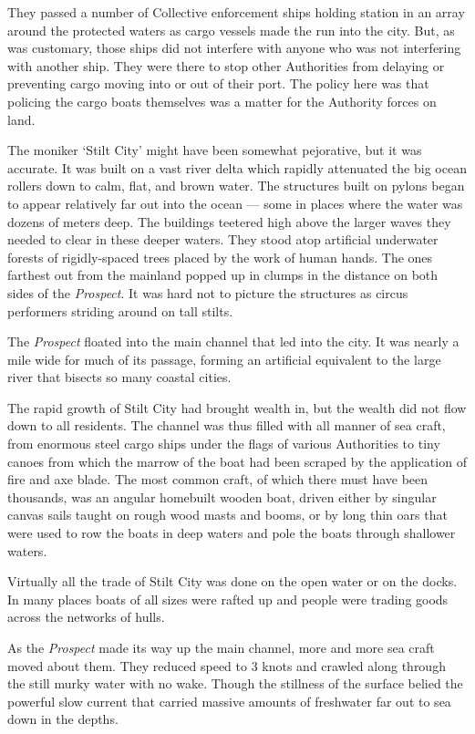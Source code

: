 \documentclass[]{scrbook}
\begin{document}
They passed a number of Collective enforcement ships holding station in
an array around the protected waters as cargo vessels made the run into
the city. But, as was customary, those ships did not interfere with
anyone who was not interfering with another ship. They were there to
stop other Authorities from delaying or preventing cargo moving into or
out of their port. The policy here was that policing the cargo boats
themselves was a matter for the Authority forces on land.

The moniker `Stilt City' might have been somewhat pejorative, but it was
accurate. It was built on a vast river delta which rapidly attenuated
the big ocean rollers down to calm, flat, and brown water. The
structures built on pylons began to appear relatively far out into the
ocean --- some in places where the water was dozens of meters deep. The
buildings teetered high above the larger waves they needed to clear in
these deeper waters. They stood atop artificial underwater forests of
rigidly-spaced trees placed by the work of human hands. The ones
farthest out from the mainland popped up in clumps in the distance on
both sides of the \emph{Prospect}. It was hard not to picture the
structures as circus performers striding around on tall stilts.

The \emph{Prospect} floated into the main channel that led into the
city. It was nearly a mile wide for much of its passage, forming an
artificial equivalent to the large river that bisects so many coastal
cities.

The rapid growth of Stilt City had brought wealth in, but the wealth did
not flow down to all residents. The channel was thus filled with all
manner of sea craft, from enormous steel cargo ships under the flags of
various Authorities to tiny canoes from which the marrow of the boat had
been scraped by the application of fire and axe blade. The most common
craft, of which there must have been thousands, was an angular homebuilt
wooden boat, driven either by singular canvas sails taught on rough wood
masts and booms, or by long thin oars that were used to row the boats in
deep waters and pole the boats through shallower waters.

Virtually all the trade of Stilt City was done on the open water or on
the docks. In many places boats of all sizes were rafted up and people
were trading goods across the networks of hulls.

As the \emph{Prospect} made its way up the main channel, more and more
sea craft moved about them. They reduced speed to 3 knots and crawled
along through the still murky water with no wake. Though the stillness
of the surface belied the powerful slow current that carried massive
amounts of freshwater far out to sea down in the depths.
\end{document}
